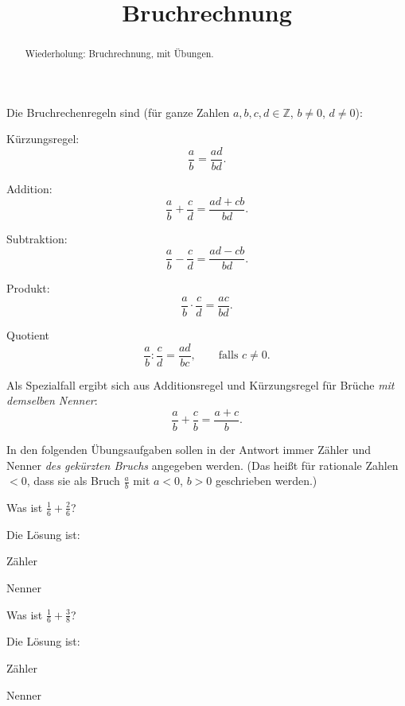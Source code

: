 \documentclass{ximera}
\title{Bruchrechnung}
\begin{document}
\begin{abstract}
Wiederholung: Bruchrechnung, mit Übungen.
\end{abstract}
\maketitle

Die Bruchrechenregeln sind (für ganze Zahlen $a,b,c,d\in\mathbb Z$, $b\ne 0$, $d\ne 0$):

Kürzungsregel:
\[
\frac{a}{b} = \frac{ad}{bd}.
\]

Addition:
\[
\frac{a}{b} + \frac{c}{d} = \frac{ad  +cb}{bd}.
\]

Subtraktion:
\[
\frac{a}{b} - \frac{c}{d} = \frac{ad  -cb}{bd}.
\]

Produkt:
\[
\frac{a}{b} \cdot \frac{c}{d} = \frac{ac}{bd}.
\]

Quotient
\[
\frac{a}{b} : \frac{c}{d} = \frac{ad}{bc},\qquad \text{falls } c\ne 0.
\]


Als Spezialfall ergibt sich aus Additionsregel und Kürzungsregel für Brüche \emph{mit demselben Nenner}:
\[
\frac{a}{b} + \frac{c}{b} = \frac{a  +c}{b}.
\]



In den folgenden Übungsaufgaben sollen in der Antwort immer Zähler und Nenner \emph{des gekürzten Bruchs} angegeben werden. (Das heißt für rationale Zahlen $<0$, dass sie als Bruch $\frac ab$ mit $a<0$, $b>0$ geschrieben werden.)


\begin{question}[5cm]
Was ist $\frac{1}{6} + \frac{2}{6}$?
\begin{solution}
Die Lösung ist:

Zähler 
\end{solution}

\begin{solution}
Nenner 
\end{solution}
\end{question}


\begin{question}
Was ist $\frac{1}{6} + \frac{3}{8}$?
\begin{solution}
Die Lösung ist:

Zähler 
\end{solution}

\begin{solution}
Nenner 
\end{solution}
\end{question}
\end{document}
